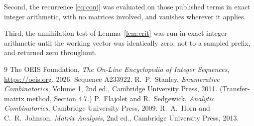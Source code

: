 \documentclass[11pt,a4paper]{article}
\theoremstyle{plain}
\theoremstyle{definition}
\begin{document}
Second, the recurrence \eqref{eq:conj} was evaluated on those published terms in exact
integer arithmetic, with no matrices involved, and vanishes wherever it applies.

Third, the annihilation test of Lemma~\ref{lem:crit} was run in exact integer arithmetic
until the working vector was identically zero, not to a sampled prefix, and returned zero
throughout.

\begin{thebibliography}{9}
 The OEIS Foundation, \emph{The On-Line Encyclopedia of Integer
Sequences}, \url{https://oeis.org}, 2026. Sequence A233922.
 R.~P.~Stanley, \emph{Enumerative Combinatorics}, Volume 1, 2nd ed.,
Cambridge University Press, 2011. (Transfer-matrix method, Section 4.7.)
 P.~Flajolet and R.~Sedgewick, \emph{Analytic Combinatorics}, Cambridge
University Press, 2009.
 R.~A.~Horn and C.~R.~Johnson, \emph{Matrix Analysis}, 2nd ed., Cambridge
University Press, 2013.
\end{thebibliography}
\end{document}
